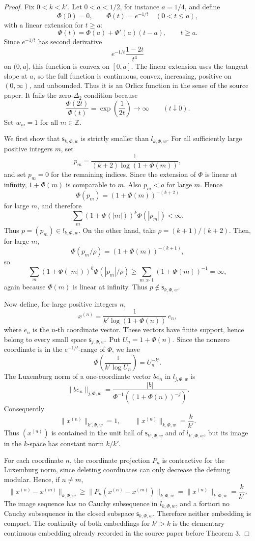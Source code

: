 \documentclass[11pt]{article}
\newcommand{\Z}{\mathbb Z}
\begin{document}
\begin{proof}
Fix \(0<k<k'\).  Let \(0<a<1/2\), for instance \(a=1/4\), and define
\[
\Phi(0)=0,\qquad \Phi(t)=e^{-1/t}\quad (0<t\leq a),
\]
with a linear extension for \(t\geq a\):
\[
\Phi(t)=\Phi(a)+\Phi'(a)(t-a),\qquad t\geq a.
\]
Since \(e^{-1/t}\) has second derivative
\[
  e^{-1/t}\frac{1-2t}{t^4}
\]
on \((0,a]\), this function is convex on \([0,a]\).  The linear extension
uses the tangent slope at \(a\), so the full function is continuous, convex,
increasing, positive on \((0,\infty)\), and unbounded.  Thus it is an Orlicz
function in the sense of the source paper.  It fails the zero-\(\Delta_2\)
condition because
\[
  \frac{\Phi(2t)}{\Phi(t)}
  =\exp\!\left(\frac{1}{2t}\right)\to\infty
  \qquad (t\downarrow 0).
\]
Set \(w_m=1\) for all \(m\in\Z\).

We first show that \(\mathsf{s}_{k,\Phi,w}\) is strictly smaller than
\(l_{k,\Phi,w}\).  For all sufficiently large positive integers \(m\), set
\[
  p_m=\frac{1}{(k+2)\log(1+\Phi(m))},
\]
and set \(p_m=0\) for the remaining indices.  Since the extension of \(\Phi\)
is linear at infinity, \(1+\Phi(m)\) is comparable to \(m\).  Also \(p_m<a\)
for large \(m\).  Hence
\[
  \Phi(p_m)=(1+\Phi(m))^{-(k+2)}
\]
for large \(m\), and therefore
\[
  \sum_m (1+\Phi(|m|))^k\Phi(|p_m|)
  <\infty.
\]
Thus \(p=(p_m)\in l_{k,\Phi,w}\).  On the other hand, take
\(\rho=(k+1)/(k+2)\).  Then, for large \(m\),
\[
  \Phi(p_m/\rho)=(1+\Phi(m))^{-(k+1)},
\]
so
\[
  \sum_m (1+\Phi(|m|))^k\Phi(|p_m|/\rho)
  \geq \sum_{m\gg 1}(1+\Phi(m))^{-1}=\infty,
\]
again because \(\Phi(m)\) is linear at infinity.  Thus \(p\notin
\mathsf{s}_{k,\Phi,w}\).

Now define, for large positive integers \(n\),
\[
  x^{(n)}=\frac{1}{k'\log(1+\Phi(n))}\,e_n,
\]
where \(e_n\) is the \(n\)-th coordinate vector.  These vectors have finite
support, hence belong to every small space \(\mathsf{s}_{j,\Phi,w}\).  Put
\(U_n=1+\Phi(n)\).  Since the nonzero coordinate is in the
\(e^{-1/t}\)-range of \(\Phi\), we have
\[
  \Phi\!\left(\frac{1}{k'\log U_n}\right)=U_n^{-k'}.
\]
The Luxemburg norm of a one-coordinate vector \(b e_n\) in \(l_{j,\Phi,w}\)
is
\[
  \|b e_n\|_{j,\Phi,w}
  =\frac{|b|}{\Phi^{-1}((1+\Phi(n))^{-j})}.
\]
Consequently
\[
  \|x^{(n)}\|_{k',\Phi,w}=1,
  \qquad
  \|x^{(n)}\|_{k,\Phi,w}=\frac{k}{k'}.
\]
Thus \((x^{(n)})\) is contained in the unit ball of \(\mathsf{s}_{k',\Phi,w}\)
and of \(l_{k',\Phi,w}\), but its image in the \(k\)-space has constant norm
\(k/k'\).

For each coordinate \(n\), the coordinate projection \(P_n\) is contractive
for the Luxemburg norm, since deleting coordinates can only decrease the
defining modular.  Hence, if \(n\ne m\),
\[
  \|x^{(n)}-x^{(m)}\|_{k,\Phi,w}
  \geq \|P_n(x^{(n)}-x^{(m)})\|_{k,\Phi,w}
  =\|x^{(n)}\|_{k,\Phi,w}
  =\frac{k}{k'}.
\]
The image sequence has no Cauchy subsequence in \(l_{k,\Phi,w}\), and a
fortiori no Cauchy subsequence in the closed subspace
\(\mathsf{s}_{k,\Phi,w}\).  Therefore neither embedding is compact.  The
continuity of both embeddings for \(k'>k\) is the elementary continuous
embedding already recorded in the source paper before Theorem 3.
\end{proof}
\end{document}
